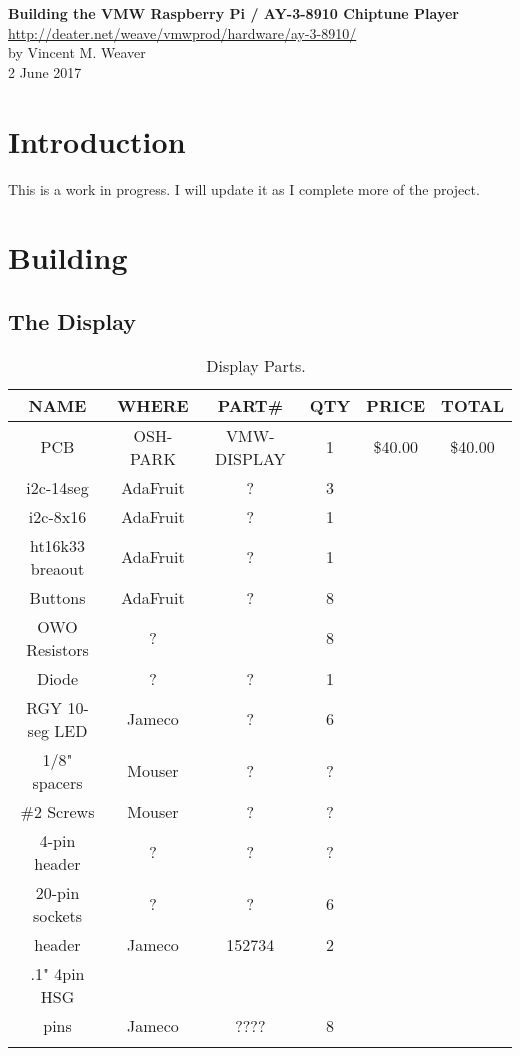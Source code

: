\documentclass[11pt]{article}
\begin{document}
\begin{center}
{\Large \bf Building the VMW Raspberry Pi / AY-3-8910 Chiptune Player}\\
\url{http://deater.net/weave/vmwprod/hardware/ay-3-8910/}\\
by Vincent M. Weaver\\
2 June 2017
\end{center}


\section{Introduction}

This is a work in progress.  I will update it as I complete more
of the project.



\section{Building}

\subsection{The Display}

\begin{table}

\caption{Display Parts.~\label{table:display_parts}}
\centering
\begin{tabular}{|c|c|c|c|c|c|}
\hline
NAME		& WHERE		& PART\#	& QTY	& PRICE		& TOTAL \\
\hline
\hline
PCB		& OSH-PARK	& VMW-DISPLAY	& 1	& \$40.00	& \$40.00 \\
\hline
i2c-14seg	& AdaFruit	& ?		& 3	&		&	\\
\hline
i2c-8x16	& AdaFruit	& ?		& 1	&		&	\\
\hline
ht16k33 breaout	& AdaFruit	& ?		& 1	&		&	\\
\hline
Buttons		& AdaFruit	& ?		& 8	&		&	\\
\hline
OWO Resistors	& ?		& 		& 8	& 		&	\\
\hline
Diode		& ?		& ?		& 1	& 		&	\\
\hline
RGY 10-seg LED	& Jameco	& ?		& 6	& 		&	\\
\hline
1/8" spacers	& Mouser	& ?		& ?	& 		&	\\
\hline
\#2 Screws	& Mouser	& ?		& ?	& 		&	\\
\hline
4-pin header	& ?		& ?		& ?	& 		&	\\
\hline
20-pin sockets	& ?		& ?		& 6	& 		&	\\
\hline
header		& Jameco	& 152734	& 2	& 		&	\\
.1" 4pin HSG	& 		&		&	&		&	\\
\hline
pins		& Jameco	& ????		& 8	&		&	\\
\hline
\hline
		&		&		&	&		&	\\
\hline
\end{tabular}
\end{table}
\end{document}
